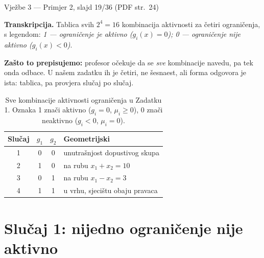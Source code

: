 \begin{izvor}{Vježbe 3 --- Primjer 2, slajd 19/36 (PDF str.~24)}

\textbf{Transkripcija.} Tablica svih $2^4 = 16$ kombinacija aktivnosti za četiri
ograničenja, s legendom: \emph{1 --- ograničenje je aktivno ($g_i(x) = 0$);
0 --- ograničenje nije aktivno ($g_i(x) < 0$)}.

\textbf{Zašto to prepisujemo:} profesor očekuje da se \emph{sve} kombinacije
navedu, pa tek onda odbace. U našem zadatku ih je četiri, ne šesnaest, ali forma
odgovora je ista: tablica, pa provjera slučaj po slučaj.
\end{izvor}

\begin{table}[H]
\centering
\caption{Sve kombinacije aktivnosti ograničenja u Zadatku 1. Oznaka 1 znači
aktivno ($g_i = 0$, $\mu_i \geq 0$), 0 znači neaktivno ($g_i < 0$, $\mu_i = 0$).}
\label{tab:z1b-slucajevi}
\begin{tabular}{cccl}
\toprule
\textbf{Slučaj} & $g_1$ & $g_2$ & \textbf{Geometrijski} \\
\midrule
1 & 0 & 0 & unutrašnjost dopustivog skupa \\
2 & 1 & 0 & na rubu $x_1 + x_2 = 10$ \\
3 & 0 & 1 & na rubu $x_1 - x_2 = 3$ \\
4 & 1 & 1 & u vrhu, sjecištu obaju pravaca \\
\bottomrule
\end{tabular}
\end{table}

\section{Slučaj 1: nijedno ograničenje nije aktivno}
\label{sec:z1b-slucaj1}

